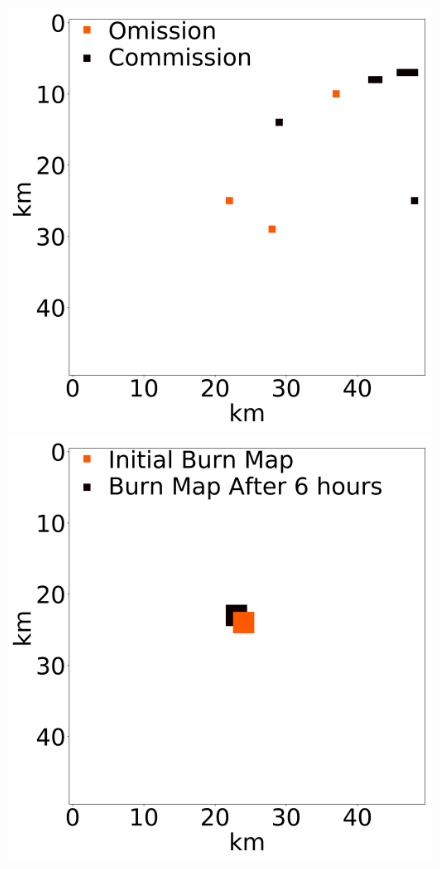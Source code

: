 \documentclass[smallcondensed]{svjour3}     %
\begin{document}
\begin{figure}[htbp]
	\includegraphics[height=0.17\textheight]{exampleNetworkError0.png}
	\\
	\includegraphics[height=0.17\textheight]{exampleFusedFire1.png}

\end{figure}
\end{document}
